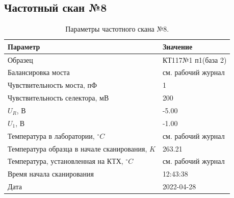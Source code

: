 \subsection{Частотный скан №8}
\begin{table}[!ht]
    \centering
    \caption{Параметры частотного скана №8.}
    \begin{tabular}{|l|l|}
        \hline
        Параметр                                       & Значение                  \\ \hline
        Образец                                        & КТ117№1 п1(база 2)        \\ \hline
        Балансировка моста                             & см. рабочий журнал        \\ \hline
        Чувствительность моста, пФ                     & 1                         \\ \hline
        Чувствительность селектора, мВ                 & 200                       \\ \hline
        $U_R$, В                                       & -5.00                     \\ \hline
        $U_1$, В                                       & -1.00                     \\ \hline
        Температура в лаборатории, $^\circ C$          & см. рабочий журнал        \\ \hline
        Температура образца в начале сканирования, $K$ & 263.21                    \\ \hline
        Температура, установленная на КТХ, $^\circ C$  & см. рабочий журнал        \\ \hline
        Время начала сканирования                      & 12:43:38                  \\ \hline
        Дата                                           & 2022-04-28                \\ \hline
    \end{tabular}
    \label{table:frequency_scan_8}
\end{table}

